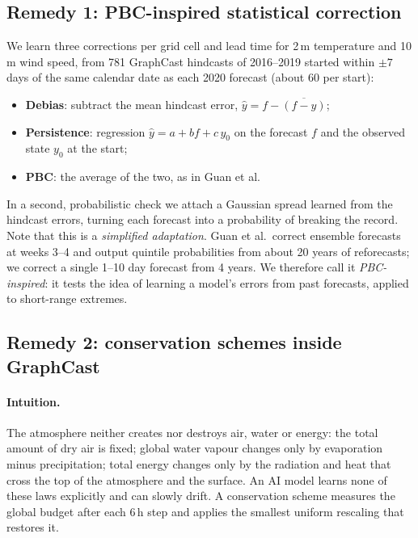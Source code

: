 \documentclass{article}
\begin{document}
\subsection{Remedy 1: PBC-inspired statistical correction}
\label{sec:pbc}
We learn three corrections per grid cell and lead time for 2\,m temperature and 10\,m wind speed, from 781 GraphCast hindcasts of 2016--2019
started within $\pm 7$ days of the same calendar date as each 2020 forecast (about 60 per start):
\begin{itemize}[leftmargin=*]
  \item \textbf{Debias}: subtract the mean hindcast error, $\hat y = f - \overline{(f - y)}$;
  \item \textbf{Persistence}: regression $\hat y = a + b f + c\, y_0$ on the forecast $f$ and the observed state $y_0$ at the start;
  \item \textbf{PBC}: the average of the two, as in Guan et al.
\end{itemize}
In a second, probabilistic check we attach a Gaussian spread learned from the hindcast errors, turning each forecast into
a probability of breaking the record. Note that this is a \emph{simplified adaptation}. Guan et al.\ correct ensemble forecasts at weeks 3--4 and
output quintile probabilities from about 20 years of reforecasts; we correct a single 1--10 day forecast from 4 years.
We therefore call it \emph{PBC-inspired}: it tests the idea of learning a model's errors from past forecasts, applied to short-range extremes.

\subsection{Remedy 2: conservation schemes inside GraphCast}
\label{sec:physics}
\paragraph{Intuition.}
The atmosphere neither creates nor destroys air, water or energy: the total amount of dry air is fixed; global water vapour changes only by
evaporation minus precipitation; total energy changes only by the radiation and heat that cross the top of the atmosphere and the surface.
An AI model learns none of these laws explicitly and can slowly drift. A conservation scheme measures the global budget after each 6\,h step and
applies the smallest uniform rescaling that restores it.
\end{document}
